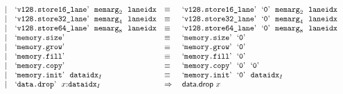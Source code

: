 $$\begin{array}[t]{@{}lrrl@{}l@{}l@{}l@{}}
& & | & \mbox{‘\texttt{v128.store16\_lane}’}~~{{\mathtt{memarg}}}_{2}~~{\mathtt{laneidx}} & \quad\equiv\quad{} & \mbox{‘\texttt{v128.store16\_lane}’}~~\mbox{‘\texttt{0}’}~~{{\mathtt{memarg}}}_{2}~~{\mathtt{laneidx}} \\
& & | & \mbox{‘\texttt{v128.store32\_lane}’}~~{{\mathtt{memarg}}}_{4}~~{\mathtt{laneidx}} & \quad\equiv\quad{} & \mbox{‘\texttt{v128.store32\_lane}’}~~\mbox{‘\texttt{0}’}~~{{\mathtt{memarg}}}_{4}~~{\mathtt{laneidx}} \\
& & | & \mbox{‘\texttt{v128.store64\_lane}’}~~{{\mathtt{memarg}}}_{8}~~{\mathtt{laneidx}} & \quad\equiv\quad{} & \mbox{‘\texttt{v128.store64\_lane}’}~~\mbox{‘\texttt{0}’}~~{{\mathtt{memarg}}}_{8}~~{\mathtt{laneidx}} \\
& & | & \mbox{‘\texttt{memory.size}’} & \quad\equiv\quad{} & \mbox{‘\texttt{memory.size}’}~~\mbox{‘\texttt{0}’} \\
& & | & \mbox{‘\texttt{memory.grow}’} & \quad\equiv\quad{} & \mbox{‘\texttt{memory.grow}’}~~\mbox{‘\texttt{0}’} \\
& & | & \mbox{‘\texttt{memory.fill}’} & \quad\equiv\quad{} & \mbox{‘\texttt{memory.fill}’}~~\mbox{‘\texttt{0}’} \\
& & | & \mbox{‘\texttt{memory.copy}’} & \quad\equiv\quad{} & \mbox{‘\texttt{memory.copy}’}~~\mbox{‘\texttt{0}’}~~\mbox{‘\texttt{0}’} \\
& & | & \mbox{‘\texttt{memory.init}’}~~{{\mathtt{dataidx}}}_{I} & \quad\equiv\quad{} & \mbox{‘\texttt{memory.init}’}~~\mbox{‘\texttt{0}’}~~{{\mathtt{dataidx}}}_{I} \\
& & | & \mbox{‘\texttt{data.drop}’}~~x{:}{{\mathtt{dataidx}}}_{I} & \quad\Rightarrow\quad{} & \mathsf{data{.}drop}~x \\
\end{array}
$$

\vspace{1ex}

